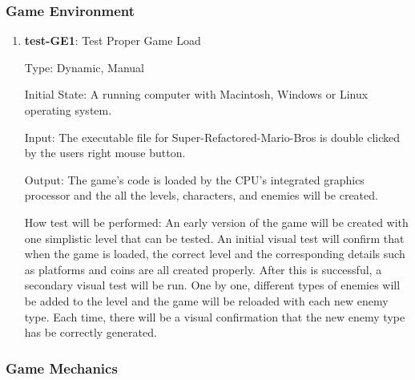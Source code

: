 \documentclass[12pt, titlepage]{article}
\begin{document}
\subsubsection{Game Environment}

\begin{enumerate}

\item{\textbf{test-GE1}: Test Proper Game Load\\}

Type: Dynamic, Manual

Initial State: A running computer with Macintosh, Windows or Linux operating system.

Input: The executable file for Super-Refactored-Mario-Bros is double clicked by the users right mouse button.

Output: The game's code is loaded by the CPU's integrated graphics processor and the all the levels, characters, and enemies will be created.

How test will be performed: An early version of the game will be created with one simplistic level that can be tested. An initial visual test will confirm that when the game is loaded, the correct level and the corresponding details such as platforms and coins are all created properly. After this is successful, a secondary visual test will be run. One by one, different types of enemies will be added to the level and the game will be reloaded with each new enemy type. Each time, there will be a visual confirmation that the new enemy type has be correctly generated.

\end{enumerate}

\subsubsection{Game Mechanics}
\end{document}
